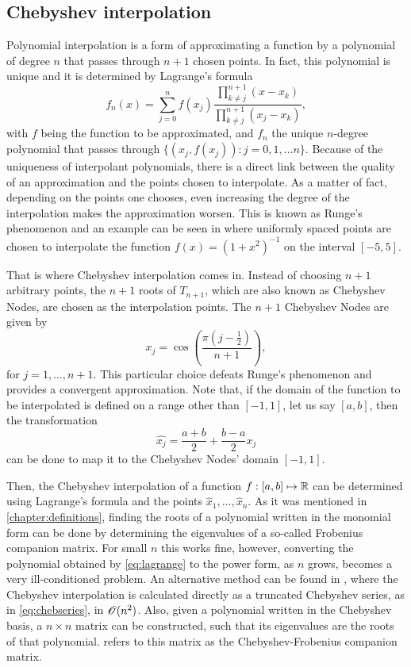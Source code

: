 \subsection{Chebyshev interpolation}
Polynomial interpolation is a form of approximating a function by a polynomial of degree $n$ that passes through $n+1$ chosen points. In fact, this polynomial is unique and it is determined by Lagrange's formula
\begin{equation}\label{eq:lagrange}
f_n(x) = \sum_{j=0}^{n} f(x_j)\dfrac{\prod_{k \neq j}^{n+1} (x-x_k)}{\prod_{k \neq j}^{n+1} (x_j-x_k)},
\end{equation}
with $f$ being the function to be approximated, and $f_n$ the unique $n$-degree polynomial that passes through $\{(x_j, f(x_j)): j=0, 1, \dots n\}$. Because of the uniqueness of interpolant polynomials, there is a direct link between the quality of an approximation and the points chosen to interpolate. As a matter of fact, depending on the points one chooses, even increasing the degree of the interpolation makes the approximation worsen. This is known as Runge's phenomenon and an example can be seen in  where uniformly spaced points are chosen to interpolate the function $f(x) = (1+x^2)^{-1}$ on the interval $[-5, 5]$. 

That is where Chebyshev interpolation comes in. Instead of choosing $n+1$ arbitrary points, the $n+1$ roots of $T_{n+1}$, which are also known as Chebyshev Nodes, are chosen as the interpolation points. The $n+1$ Chebyshev Nodes are given by
\begin{equation}
x_j = \cos{\left(\dfrac{\pi(j-\frac{1}{2})}{n+1}\right)},
\end{equation}
for $j=1, \dots, n+1$. This particular choice defeats Runge's phenomenon and provides a convergent approximation. 
Note that, if the domain of the function to be interpolated is defined on a range other than $[-1, 1]$, let us say $[a, b]$, then the transformation
\begin{equation}
\hat{x_j} = \frac{a+b}{2} + \frac{b-a}{2}x_j
\end{equation}
can be done to map it to the Chebyshev Nodes' domain $[-1, 1]$.

Then, the Chebyshev interpolation of a function $f: [a, b] \mapsto \mathbb{R}$ can be determined using Lagrange's formula and the points $\hat{x}_1, \dots, \hat{x}_n$. 
As it was mentioned in \autoref{chapter:definitions}, finding the roots of a polynomial written in the monomial form can be done by determining the eigenvalues of a so-called Frobenius companion matrix. For small $n$ this works fine, however, converting the polynomial obtained by \autoref{eq:lagrange} to the power form, as $n$ grows, becomes a very ill-conditioned problem. 
An alternative method can be found in , where the Chebyshev interpolation is calculated directly as a truncated Chebyshev series, as in \autoref{eq:chebseries}, in $\mathscr{O}(n^2)$. Also, given a polynomial written in the Chebyshev basis, a $n\times n$ matrix can be constructed, such that its eigenvalues are the roots of that polynomial.  refers to this matrix as the Chebyshev-Frobenius companion matrix.

